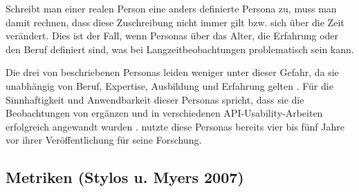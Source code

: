 \begin{important}
Schreibt man einer realen Person eine anders definierte Persona zu, muss man damit rechnen, dass diese Zuschreibung nicht immer gilt bzw. sich über die Zeit verändert. Dies ist der Fall, wenn Personas über das Alter, die Erfahrung oder den Beruf definiert sind, was bei Langzeitbeobachtungen problematisch sein kann.

Die drei von \cite{Stylos:2007jb} beschriebenen Personas leiden weniger unter dieser Gefahr, da sie unabhängig von Beruf, Expertise, Ausbildung und Erfahrung gelten \citep{clarke:DSP:2007:1080,Stylos:2006td}.
Für die Sinnhaftigkeit und Anwendbarkeit dieser Personas spricht, dass sie die Beobachtungen von \cite{Shaft:1998tc} ergänzen und in verschiedenen API-Usability-Arbeiten erfolgreich angewandt wurden \citep{Stylos:2007jb,Stylos:2008cu,Stylos:2008jt}. \cite{clarke:DSP:2007:1080} nutzte diese Personas bereits vier bis fünf Jahre vor ihrer Veröffentlichung für seine Forschung.
\end{important}


\subsection{Metriken (Stylos u. Myers 2007)}

